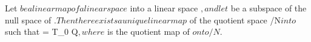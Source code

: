 Let $ be a linear map of a linear space $ into a linear space $, and let $ be a subspace of the null space of $. Then there exists a unique linear map $ of the quotient space /N$ into $ such that  = T_0 \circ Q$, where $ is the quotient map of $ onto /N$.
